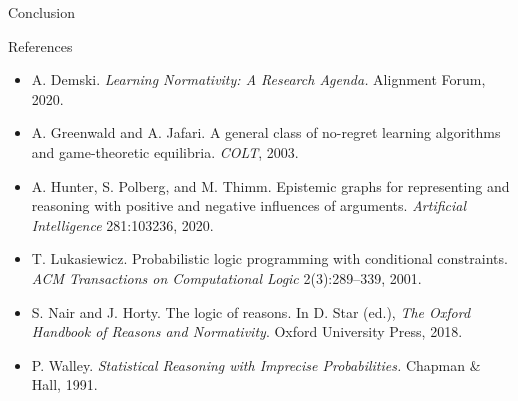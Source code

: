\documentclass[aspectratio=169,professionalfonts]{beamer}
\begin{document}
\begin{frame}[t]{Conclusion}
\vspace{1.55cm}
{\setlength{\fboxsep}{6pt}\setlength{\fboxrule}{1pt}%
\centering
{}%
%
%
%
\par}
\end{frame}

\begin{frame}[t]{References}
\vspace{0.15cm}
{\small
\begin{itemize}\setlength\itemsep{0.45em}
  \item A. Demski. \emph{Learning Normativity: A Research Agenda.} Alignment Forum, 2020.
  \item A. Greenwald and A. Jafari. A general class of no-regret learning algorithms and game-theoretic equilibria. \emph{COLT}, 2003.
  \item A. Hunter, S. Polberg, and M. Thimm. Epistemic graphs for representing and reasoning with positive and negative influences of arguments. \emph{Artificial Intelligence} 281:103236, 2020.
  \item T. Lukasiewicz. Probabilistic logic programming with conditional constraints. \emph{ACM Transactions on Computational Logic} 2(3):289--339, 2001.
  \item S. Nair and J. Horty. The logic of reasons. In D. Star (ed.), \emph{The Oxford Handbook of Reasons and Normativity}. Oxford University Press, 2018.
  \item P. Walley. \emph{Statistical Reasoning with Imprecise Probabilities.} Chapman \& Hall, 1991.
\end{itemize}
}
\end{frame}
\end{document}
